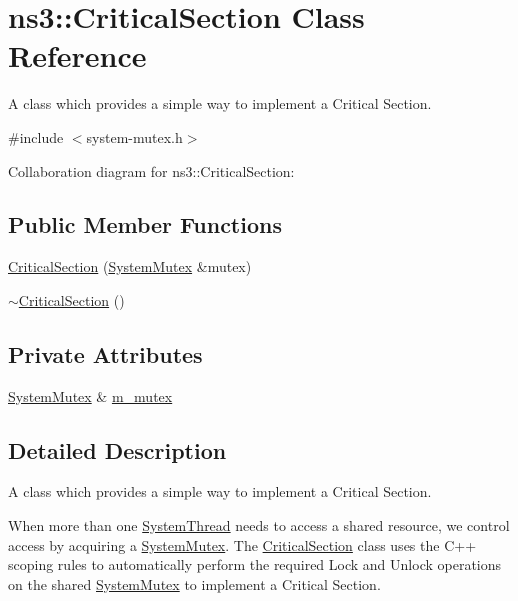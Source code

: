 \hypertarget{classns3_1_1CriticalSection}{}\section{ns3\+:\+:Critical\+Section Class Reference}
\label{classns3_1_1CriticalSection}


A class which provides a simple way to implement a Critical Section.  




{\ttfamily \#include $<$system-\/mutex.\+h$>$}



Collaboration diagram for ns3\+:\+:Critical\+Section\+:
\subsection*{Public Member Functions}
\begin{DoxyCompactItemize}
\item 
\hyperlink{classns3_1_1CriticalSection_a35704dd8cd5640871670bd52f6ba6bad}{Critical\+Section} (\hyperlink{classns3_1_1SystemMutex}{System\+Mutex} \&mutex)
\item 
\hyperlink{classns3_1_1CriticalSection_ad2142c4a368cecaee74111a7f2a1554d}{$\sim$\+Critical\+Section} ()
\end{DoxyCompactItemize}
\subsection*{Private Attributes}
\begin{DoxyCompactItemize}
\item 
\hyperlink{classns3_1_1SystemMutex}{System\+Mutex} \& \hyperlink{classns3_1_1CriticalSection_a083af9071caca5a2a4c5dd8aa60516d4}{m\+\_\+mutex}
\end{DoxyCompactItemize}


\subsection{Detailed Description}
A class which provides a simple way to implement a Critical Section. 

When more than one \hyperlink{classns3_1_1SystemThread}{System\+Thread} needs to access a shared resource, we control access by acquiring a \hyperlink{classns3_1_1SystemMutex}{System\+Mutex}. The \hyperlink{classns3_1_1CriticalSection}{Critical\+Section} class uses the C++ scoping rules to automatically perform the required Lock and Unlock operations on the shared \hyperlink{classns3_1_1SystemMutex}{System\+Mutex} to implement a Critical Section.

